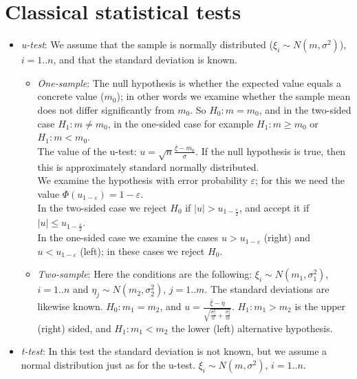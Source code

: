 \documentclass[margin=0px]{article}
\begin{document}
\section{Classical statistical tests}

\begin{itemize}
    \item \textit{u-test}: We assume that the sample is normally distributed ($\xi_i \sim N(m, \sigma^2)$), $i=1..n$, and that the standard deviation is known.
          \begin{itemize}
              \item \textit{One-sample}: The null hypothesis is whether the expected value equals a concrete value ($m_0$); in other words we examine whether the sample mean does not differ significantly from $m_0$. So $H_0: m = m_0$, and in the two-sided case $H_1: m \neq m_0$, in the one-sided case for example $H_1: m \geq m_0$ or $H_1: m < m_0$. \\
                    The value of the u-test: $u = \sqrt{n}\frac{\overline{\xi} - m_0}{\sigma}$. If the null hypothesis is true, then this is approximately standard normally distributed. \\
                    We examine the hypothesis with error probability $\varepsilon$; for this we need the value $\Phi(u_{1-\varepsilon}) = 1 - \varepsilon$. \\
                    In the two-sided case we reject $H_0$ if $|u| > u_{1-\frac{\varepsilon}{2}}$, and accept it if $|u| \leq u_{1-\frac{\varepsilon}{2}}$. \\
                    In the one-sided case we examine the cases $u > u_{1-\varepsilon}$ (right) and $u < u_{1-\varepsilon}$ (left); in these cases we reject $H_0$.
              \item \textit{Two-sample}: Here the conditions are the following: $\xi_i \sim N(m_1, \sigma_1^2)$, $i=1..n$ and $\eta_j \sim N(m_2, \sigma_2^2)$, $j=1..m$. The standard deviations are likewise known. $H_0: m_1 = m_2$, and $u = \frac{\overline{\xi} - \overline{\eta}}{\sqrt{\frac{\sigma_1^2}{n} + \frac{\sigma_2^2}{m}}}$. $H_1 : m_1 > m_2$ is the upper (right) sided, and $H_1 : m_1 < m_2$ the lower (left) alternative hypothesis.
          \end{itemize}
    \item \textit{t-test}:	In this test the standard deviation is not known, but we assume a normal distribution just as for the u-test. $\xi_i \sim N(m, \sigma^2)$, $i=1..n$.
          \begin{itemize}

\end{itemize}
\end{itemize}
\end{document}

